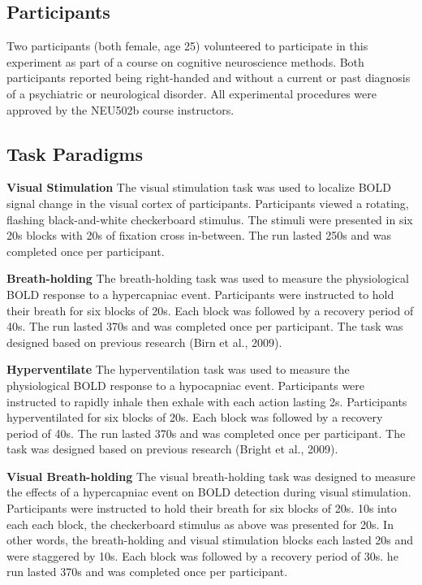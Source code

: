 \documentclass[9pt]{NEU502b-fmri}
\begin{document}
\subsection{Participants}
Two participants (both female, age 25) volunteered to participate in this experiment as part of a course on cognitive neuroscience methods. Both participants reported being right-handed and without a current or past diagnosis of a psychiatric or neurological disorder. All experimental procedures were approved by the NEU502b course instructors. 

\subsection{Task Paradigms}

\textbf{Visual Stimulation} The visual stimulation task was used to localize BOLD signal change in the visual cortex of participants. Participants viewed a rotating, flashing black-and-white checkerboard stimulus. The stimuli were presented in six 20s blocks with 20s of fixation cross in-between. The run lasted 250s and was completed once per participant.

\textbf{Breath-holding} The breath-holding task was used to measure the physiological BOLD response to a hypercapniac event. Participants were instructed to hold their breath for six blocks of 20s. Each block was followed by a recovery period of 40s. The run lasted 370s and was completed once per participant. The task was designed based on previous research (Birn et al., 2009). 

\textbf{Hyperventilate} The hyperventilation task was used to measure the physiological BOLD response to a hypocapniac event. Participants were instructed to rapidly inhale then exhale with each action lasting 2s. Participants hyperventilated for six blocks of 20s. Each block was followed by a recovery period of 40s. The run lasted 370s and was completed once per participant. The task was designed based on previous research (Bright et al., 2009). 

\textbf{Visual Breath-holding} The visual breath-holding task was designed to measure the effects of a hypercapniac event on BOLD detection during visual stimulation. Participants were instructed to hold their breath for six blocks of 20s. 10s into each each block, the checkerboard stimulus as above was presented for 20s. In other words, the breath-holding and visual stimulation blocks each lasted 20s and were staggered by 10s. Each block was followed by a recovery period of 30s. he run lasted 370s and was completed once per participant.
\end{document}
